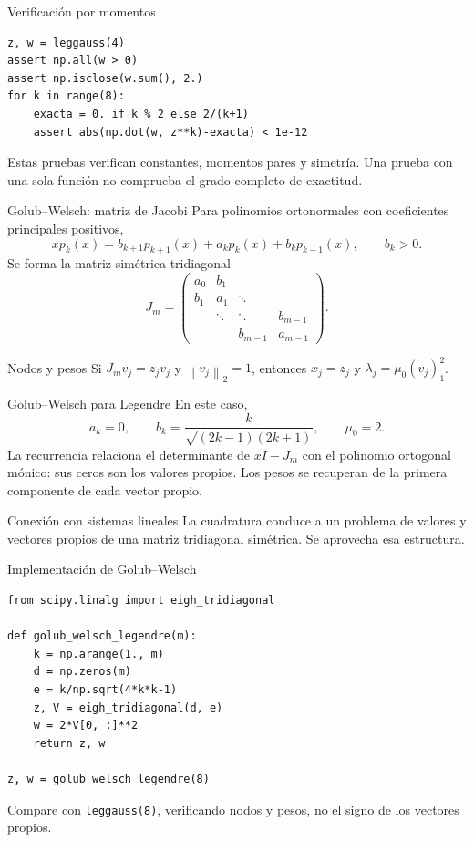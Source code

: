 \documentclass[aspectratio=169,12pt]{beamer}
\newcommand{\norm}[1]{\left\lVert#1\right\rVert}
\begin{document}
\begin{frame}[fragile]{Verificación por momentos}
\begin{lstlisting}
z, w = leggauss(4)
assert np.all(w > 0)
assert np.isclose(w.sum(), 2.)
for k in range(8):
    exacta = 0. if k % 2 else 2/(k+1)
    assert abs(np.dot(w, z**k)-exacta) < 1e-12
\end{lstlisting}

Estas pruebas verifican constantes, momentos pares y simetría.
Una prueba con una sola función no comprueba el grado completo de exactitud.
\end{frame}

\begin{frame}{Golub--Welsch: matriz de Jacobi}
Para polinomios ortonormales con coeficientes principales positivos,
\[x p_k(x)=b_{k+1}p_{k+1}(x)+a_kp_k(x)+b_kp_{k-1}(x),\qquad b_k>0.\]
Se forma la matriz simétrica tridiagonal
\[J_m=\begin{pmatrix}
a_0&b_1&&\\b_1&a_1&\ddots&\\&\ddots&\ddots&b_{m-1}\\&&b_{m-1}&a_{m-1}
\end{pmatrix}.\]
\begin{block}{Nodos y pesos}
Si $J_mv_j=z_jv_j$ y $\norm{v_j}_2=1$, entonces
$x_j=z_j$ y $\lambda_j=\mu_0(v_j)_1^2$.
\end{block}
\end{frame}

\begin{frame}{Golub--Welsch para Legendre}
En este caso,
\[a_k=0,\qquad b_k=\frac{k}{\sqrt{(2k-1)(2k+1)}},\qquad\mu_0=2.\]
La recurrencia relaciona el determinante de $xI-J_m$ con el polinomio ortogonal
mónico: sus ceros son los valores propios.
Los pesos se recuperan de la primera componente de cada vector propio.
\begin{block}{Conexión con sistemas lineales}
La cuadratura conduce a un problema de valores y vectores propios de una
matriz tridiagonal simétrica. Se aprovecha esa estructura.
\end{block}
\end{frame}

\begin{frame}[fragile]{Implementación de Golub--Welsch}
\begin{lstlisting}
from scipy.linalg import eigh_tridiagonal

def golub_welsch_legendre(m):
    k = np.arange(1., m)
    d = np.zeros(m)
    e = k/np.sqrt(4*k*k-1)
    z, V = eigh_tridiagonal(d, e)
    w = 2*V[0, :]**2
    return z, w

z, w = golub_welsch_legendre(8)
\end{lstlisting}
Compare con \texttt{leggauss(8)}, verificando nodos y pesos, no el signo de los vectores propios.
\end{frame}
\end{document}
